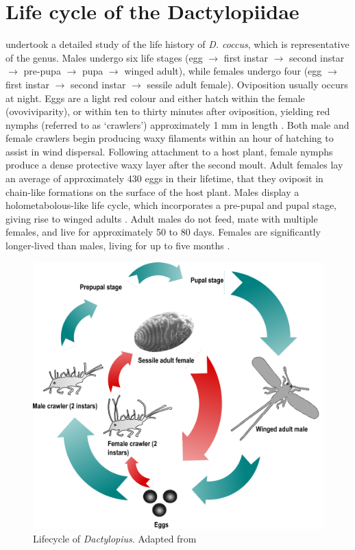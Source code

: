 \section{Life cycle of the Dactylopiidae}
\label{appendix:lifecycle}
\citet{Perez-Guerra1992} undertook a detailed study of the life history of \textit{D. coccus}, which is representative of the genus. Males undergo six life stages (egg $\rightarrow$ first instar $\rightarrow$ second instar $\rightarrow$ pre-pupa $\rightarrow$ pupa $\rightarrow$ winged adult), while females undergo four (egg $\rightarrow$ first instar $\rightarrow$ second instar $\rightarrow$ sessile adult female). Oviposition usually occurs at night. Eggs are a light red colour and either hatch within the female (ovoviviparity), or within ten to thirty minutes after oviposition, yielding red nymphs (referred to as `crawlers') approximately 1 mm in length \citep{Nobel2002CactiUses}. Both male and female crawlers begin producing waxy filaments within an hour of hatching to assist in wind dispersal. Following attachment to a host plant, female nymphs produce a dense protective waxy layer after the second moult. Adult females lay an average of approximately 430 eggs in their lifetime, that they oviposit in chain-like formations on the surface of the host plant. Males display a holometabolous-like life cycle, which incorporates a pre-pupal and pupal stage, giving rise to winged adults \citep{Nobel2002CactiUses}. Adult males do not feed, mate with multiple females, and live for approximately 50 to 80 days. Females are significantly longer-lived than males, living for up to five months \citep{Moran1979, Nobel2002CactiUses}.
\vspace{0.4cm}

\begin{figure}[H]
	\centering
	\includegraphics[scale = 0.65]{Images/lifecycle.pdf}
	\caption{Lifecycle of \textit{Dactylopius}. Adapted from \citet{Moran1979}}
	\label{fig:lifecycle}
\end{figure}

